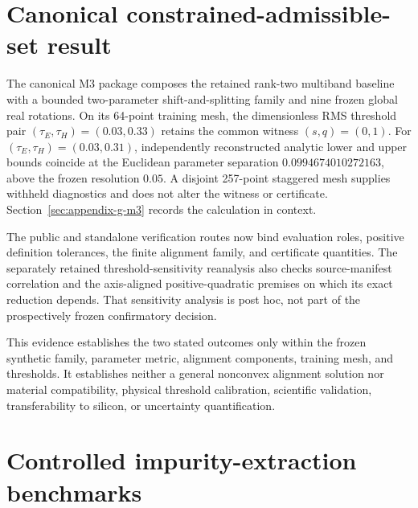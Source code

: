 \section{Canonical constrained-admissible-set result}


The canonical M3 package composes the retained rank-two multiband baseline with
a bounded two-parameter shift-and-splitting family and nine frozen global real
rotations. On its 64-point training mesh, the dimensionless RMS threshold pair
$(\tau_E,\tau_H)=(0.03,0.33)$ retains the common witness $(s,q)=(0,1)$.
For $(\tau_E,\tau_H)=(0.03,0.31)$, independently reconstructed analytic lower
and upper bounds coincide at the Euclidean parameter separation
$0.0994674010272163$, above the frozen resolution $0.05$. A disjoint
257-point staggered mesh supplies withheld diagnostics and does not alter the
witness or certificate. Section~\ref{sec:appendix-g-m3} records the calculation
in context.

The public and standalone verification routes now bind evaluation roles,
positive definition tolerances, the finite alignment family, and certificate
quantities. The separately retained threshold-sensitivity reanalysis also
checks source-manifest correlation and the axis-aligned positive-quadratic
premises on which its exact reduction depends. That sensitivity analysis is
post hoc, not part of the prospectively frozen confirmatory decision.

This evidence establishes the two stated outcomes only within the frozen
synthetic family, parameter metric, alignment components, training mesh, and
thresholds. It establishes neither a general nonconvex alignment solution nor
material compatibility, physical threshold calibration, scientific validation,
transferability to silicon, or uncertainty quantification.

\section{Controlled impurity-extraction benchmarks}


